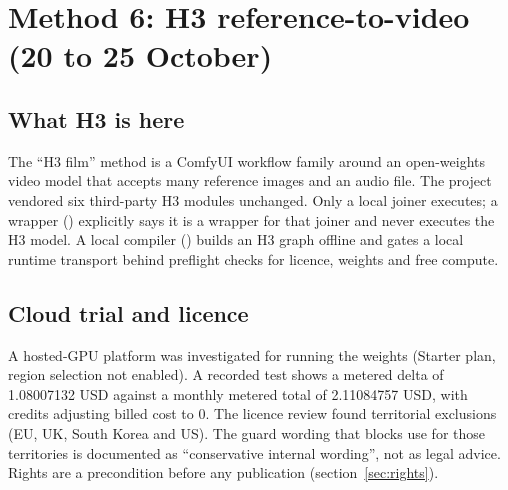 \documentclass[11pt,a4paper]{article}
\newcommand{\code}[1]{\texttt{\detokenize{#1}}}
\begin{document}
\section{Method 6: H3 reference-to-video (20 to 25 October)}
\label{sec:h3}
\subsection{What H3 is here}
The ``H3 film'' method is a ComfyUI workflow family around an open-weights video model that accepts many reference images and an audio file. The project vendored six third-party H3 modules unchanged. Only a local joiner executes; a wrapper (\code{h3_wrapper.py}) explicitly says it is a wrapper for that joiner and never executes the H3 model. A local compiler (\code{h3_local.py}) builds an H3 graph offline and gates a local runtime transport behind preflight checks for licence, weights and free compute.

\subsection{Cloud trial and licence}
A hosted-GPU platform was investigated for running the weights (Starter plan, region selection not enabled). A recorded test shows a metered delta of 1.08007132 USD against a monthly metered total of 2.11084757 USD, with credits adjusting billed cost to 0. The licence review found territorial exclusions (EU, UK, South Korea and US). The guard wording that blocks use for those territories is documented as ``conservative internal wording'', not as legal advice. Rights are a precondition before any publication (section~\ref{sec:rights}).
\end{document}
